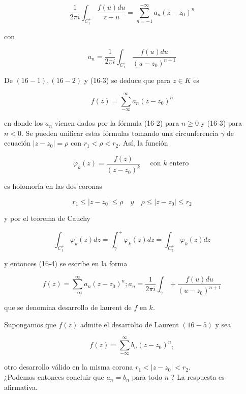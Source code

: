 \documentclass[10pt]{article}
\theoremstyle{plain}
\theoremstyle{definition}
\theoremstyle{remark}
\begin{document}
$$
\frac{1}{2 \pi i} \int_{C_{1}^{+}} \frac{f(u) d u}{z-u}=\sum_{n=-1}^{-\infty} a_{n}\left(z-z_{0}\right)^{n}
$$

con


\begin{equation*}
a_{n}=\frac{1}{2 \pi i} \int_{C_{1}^{+}} \frac{f(u) d u}{\left(u-z_{0}\right)^{n+1}} \tag{$16\cdot3$}
\end{equation*}


De $(16-1),(16-2)$ y (16-3) se deduce que para $z \in K$ es


\begin{equation*}
f(z)=\sum_{-\infty}^{\infty} a_{n}\left(z-z_{0}\right)^{n} \tag{16-4}
\end{equation*}


en donde los $a_{n}$ vienen dados por la fórmula (16-2) para $n \geqslant 0$ y (16-3) para $n<0$. Se pueden unificar estas fórmulas tomando una circunferencia $\gamma$ de ecuación $\left|z-z_{0}\right|=\rho$ con $r_{1}<\rho<r_{2}$. Así, la función

$$
\varphi_{k}(z)=\frac{f(z)}{\left(z-z_{0}\right)^{k}} \quad \text { con } k \text { entero }
$$

es holomorfa en las dos coronas

$$
r_{1} \leqslant\left|z-z_{0}\right| \leqslant \rho \quad y \quad \rho \leqslant\left|z-z_{0}\right| \leqslant r_{2}
$$

y por el teorema de Cauchy

$$
\int_{C_{1}^{+}} \varphi_{k}(z) d z=\int_{\gamma}^{+} \varphi_{k}(z) d z=\int_{C_{2}^{+}} \varphi_{k}(z) d z
$$

y entonces (16-4) se escribe en la forma


\begin{equation*}
f(z)=\sum_{-\infty}^{\infty} a_{n}\left(z-z_{0}\right)^{n} ; a_{n}=\frac{1}{2 \pi i} \int_{\gamma}+\frac{f(u) d u}{\left(u-z_{0}\right)^{n+1}} \tag{16-5}
\end{equation*}


que se denomina desarrollo de laurent de $f$ en $k$.

Supongamos que $f(z)$ admite el desarrolto de Laurent $(16-5)$ y sea

$$
f(z)=\sum_{-\infty}^{\infty} b_{n}\left(z-z_{0}\right)^{n},
$$

otro desarrollo válido en la misma corona $r_{1}<\left|z-z_{0}\right|<r_{2}$.\\
¿Podemos entonces concluir que $a_{n}=b_{n}$ para todo $n$ ? La respuesta es afirmativa.
\end{document}
